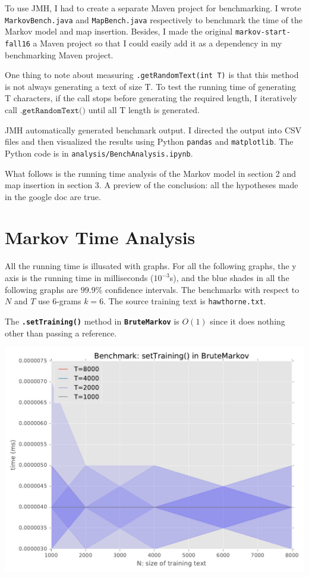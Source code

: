 \documentclass[11pt]{article}
\begin{document}
To use JMH, I had to create a separate Maven project for benchmarking. I wrote \texttt{MarkovBench.java} and \texttt{MapBench.java} respectively to benchmark the time of the Markov model and map insertion. Besides, I made the original \texttt{markov-start-fall16} a Maven project so that I could easily add it as a dependency in my benchmarking Maven project.

One thing to note about measuring \texttt{.getRandomText(int T)} is that this method is not always generating a text of size T. To test the running time of generating T characters, if the call stops before generating the required length, I iteratively call $\texttt{.getRandomText()}$ until all T length is generated.

JMH automatically generated benchmark output. I directed the output into CSV files and then visualized the results using Python \texttt{pandas} and \texttt{matplotlib}. The Python code is in \texttt{analysis/BenchAnalysis.ipynb}.

What follows is the running time analysis of the Markov model in section 2 and map insertion in section 3. A preview of the conclusion: all the hypotheses made in the google doc are true.

\section{Markov Time Analysis}

All the running time is illusated with graphs. For all the following graphs, the y axis is the running time in milliseconds ($10^{-3}$s), and the blue shades in all the following graphs are $99.9\%$ confidence intervals. The benchmarks with respect to $N$ and $T$ use 6-grams $k=6$. The source training text is \texttt{hawthorne.txt}.

The \texttt{\bf .setTraining()} method in \texttt{\bf BruteMarkov} is $O(1)$ since it does nothing other than passing a reference.

\centerline{\includegraphics[width=0.6\linewidth]{setTraining_BruteMarkov_N.pdf}}
\end{document}
